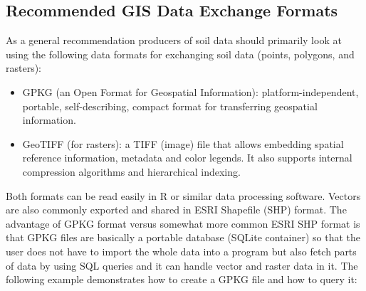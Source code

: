 \documentclass[10pt,b5paper,]{book}
\newenvironment{Shaded}{\begin{snugshade}}{\end{snugshade}}
\newcommand{\DataTypeTok}[1]{\textcolor[rgb]{0.13,0.29,0.53}{#1}}
\newcommand{\DecValTok}[1]{\textcolor[rgb]{0.00,0.00,0.81}{#1}}
\newcommand{\ErrorTok}[1]{\textcolor[rgb]{0.64,0.00,0.00}{\textbf{#1}}}
\newcommand{\KeywordTok}[1]{\textcolor[rgb]{0.13,0.29,0.53}{\textbf{#1}}}
\newcommand{\NormalTok}[1]{#1}
\newcommand{\OperatorTok}[1]{\textcolor[rgb]{0.81,0.36,0.00}{\textbf{#1}}}
\newcommand{\StringTok}[1]{\textcolor[rgb]{0.31,0.60,0.02}{#1}}
\providecommand{\tightlist}{%
  \setlength{\itemsep}{0pt}\setlength{\parskip}{0pt}}
\theoremstyle{definition}
\theoremstyle{definition}
\theoremstyle{definition}
\theoremstyle{remark}
\begin{document}
\hypertarget{recommended-gis-data-exchange-formats}{%
\subsection{Recommended GIS Data Exchange
Formats}\label{recommended-gis-data-exchange-formats}}

As a general recommendation producers of soil data should primarily look
at using the following data formats for exchanging soil data (points,
polygons, and rasters):

\begin{itemize}
\tightlist
\item
  GPKG (an Open Format for Geospatial Information):
  platform-independent, portable, self-describing, compact format for
  transferring geospatial information.
\item
  GeoTIFF (for rasters): a TIFF (image) file that allows embedding
  spatial reference information, metadata and color legends. It also
  supports internal compression algorithms and hierarchical indexing.
\end{itemize}

Both formats can be read easily in R or similar data processing
software. Vectors are also commonly exported and shared in ESRI
Shapefile (SHP) format. The advantage of GPKG format versus somewhat
more common ESRI SHP format is that GPKG files are basically a portable
database (SQLite container) so that the user does not have to import the
whole data into a program but also fetch parts of data by using SQL
queries and it can handle vector and raster data in it. The following
example demonstrates how to create a GPKG file and how to query it:

\begin{Shaded}
\end{Shaded}
\end{document}
